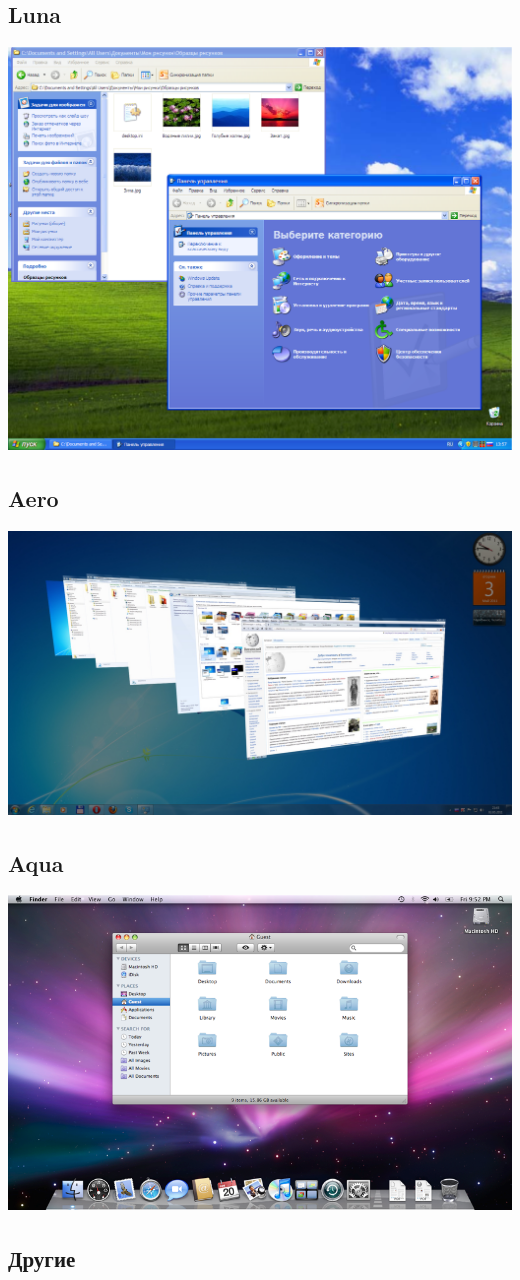 \subsection{Luna}
\includegraphics[scale=0.28]{base/Software/Luna.eps}
\subsection{Aero}
\includegraphics[scale=0.25]{base/Software/Aero}
\subsection{Aqua}
\includegraphics[scale=0.4]{base/Software/Aqua}
\subsection{Другие}

